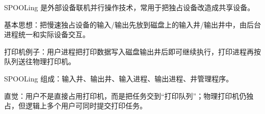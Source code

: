 \begin{points}
  \item SPOOLing 是外部设备联机并行操作技术，常用于把独占设备改造成共享设备。
  \item 基本思想：把慢速独占设备的输入/输出先放到磁盘上的输入井/输出井中，由后台进程统一和实际设备交互。
  \item 打印机例子：用户进程把打印数据写入磁盘输出井后即可继续执行，打印进程再按队列送往物理打印机。
  \item SPOOLing 组成：输入井、输出井、输入进程、输出进程、井管理程序。
  \item 直觉：用户不是直接占用打印机，而是把任务交到“打印队列”；物理打印机仍独占，但逻辑上多个用户可同时提交打印任务。
\end{points}



